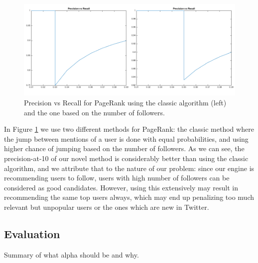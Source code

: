 \begin{figure}[H]
\centering
\includegraphics[width=5.5in,natwidth=966,natheight=420]{images/exptopr.png}
\caption{Precision vs Recall for PageRank using the classic algorithm (left) and the one based on the number of followers.}
\label{fig:exptopr}
\end{figure}

In Figure \ref{fig:exptopr} we use two different methods for PageRank: the classic method where the jump between mentions of a user is done with equal probabilities, and using higher chance of jumping based on the number of followers. As we can see, the precision-at-10 of our novel method is considerably better than using the classic algorithm, and we attribute that to the nature of our problem: since our engine is recommending users to follow, users with high number of followers can be considered as good candidates. However, using this extensively may result in recommending the same top users always, which may end up penalizing too much relevant but unpopular users or the ones which are new in Twitter.

\subsection{Evaluation}
Summary of what alpha should be and why.
